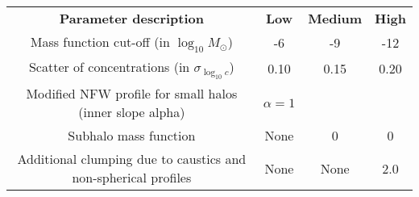 \begin{table*}
    \begin{tabular}{ c c c c }
    \textbf{Parameter description}  & \textbf{Low} & \textbf{Medium} & \textbf{High} \\
    Mass function cut-off (in $\log_{10}M_\odot$)        & -6 & -9 & -12 \\
    Scatter of concentrations (in $\sigma_{\log_{10}c}$)              & 0.10 & 0.15 & 0.20 \\
    Modified NFW profile for small halos (inner slope alpha) & $\alpha=1$ & \cite{Ishiyama_2014} &  \cite{Ishiyama_2014} \\
    Subhalo mass function & None & 0 & 0 \\
    Additional clumping due to caustics and non-spherical profiles & None & None & 2.0
\\    \end{tabular}
\end{table*}

